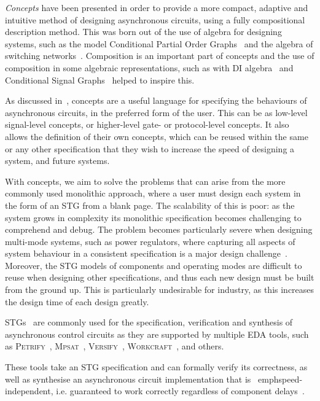 \documentclass[british,conference,compsoc]{IEEEtran}
\newcommand{\noun}[1]{\textsc{#1}}
\begin{document}
\emph{Concepts} have been presented in order to provide a more compact, 
adaptive and intuitive method of designing asynchronous circuits, using a fully
compositional description method. This was born out of the use of algebra for 
designing systems, such as the model Conditional Partial Order
Graphs~\cite{CPOG1}\cite{CPOG2}\cite{2014_mokhov_pg} and
the algebra of switching networks~\cite{mokhov2015algebra}. Composition is an 
important part of concepts and the use of composition in some algebraic 
representations, such as with DI algebra~\cite{270632} and Conditional Signal 
Graphs~\cite{6243877} helped to inspire this. 

As discussed in~\cite{2015_Beaumont_MEMOCODE}, concepts are a useful language 
for specifying the behaviours of asynchronous circuits, in the preferred form 
of the user. This can be as low-level signal-level concepts, or higher-level 
gate- or protocol-level concepts. It also allows the definition of their own 
concepts, which can be reused within the same or any other specification that 
they wish to increase the speed of designing a system, and future systems. 

With concepts, we aim to solve the problems that can arise from the more 
commonly used monolithic approach, where a user must design each system in the 
form of an STG from a blank page. The scalability of this is poor: as the 
system grows in complexity its monolithic specification becomes challenging to 
comprehend and debug. The problem becomes particularly severe when designing 
multi-mode systems, such as power regulators, where capturing all aspects of 
system behaviour in a consistent specification is a major design 
challenge~\cite{2014_sokolov_ftfc}\cite{sokolov2015design}. 
Moreover, the STG models of components and operating modes are difficult to 
reuse when designing other specifications, and thus each new design must be 
built from the ground up. This is particularly undesirable for industry, as 
this increases the design time of each design greatly. 

STGs~\cite{Chu_1987_phd}\cite{Rosenblum_1985_tpn} are commonly used for the 
specification, verification and synthesis of asynchronous control circuits as 
they are supported by multiple EDA tools, such as 
\noun{Petrify}~\cite{Cortadella}, \noun{Mpsat}~\cite{khomenko2004detecting}, 
\noun{Versify}~\cite{i1997formal}, 
\noun{Workcraft}~\cite{2007_poliakov_workcraft}\cite{Workcraft_website}, 
and others.

These tools take an STG specification and can formally verify its correctness, 
as well as synthesise an asynchronous circuit implementation that is \
emph{speed-independent}, i.e. guaranteed to work correctly regardless of 
component delays~\cite{Muller_1959_ts}.
\end{document}
